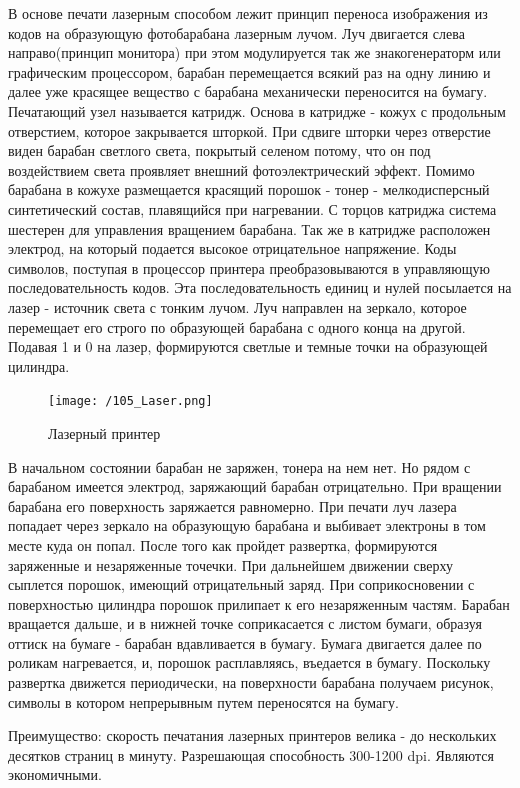 \documentclass[unicode, 12pt, a4paper, oneside]{article}
\begin{document}
В основе печати лазерным способом лежит принцип переноса изображения из кодов на образующую фотобарабана лазерным лучом. Луч двигается слева направо(принцип монитора) при этом модулируется так же знакогенераторм или графическим процессором, барабан перемещается всякий раз на одну линию и далее уже красящее вещество с барабана механически переносится на бумагу. Печатающий узел называется катридж. Основа в катридже - кожух с продольным отверстием, которое закрывается шторкой. При сдвиге шторки через отверстие виден барабан светлого света, покрытый селеном потому, что он под воздействием света проявляет внешний фотоэлектрический эффект. Помимо барабана в кожухе размещается красящий порошок - тонер - мелкодисперсный синтетический состав, плавящийся при нагревании. С торцов катриджа система шестерен для управления вращением барабана. Так же в катридже расположен электрод, на который подается высокое отрицательное напряжение. Коды символов, поступая в процессор принтера преобразовываются в управляющую последовательность кодов. Эта последовательность единиц и нулей посылается на лазер - источник света с тонким лучом. Луч направлен на зеркало, которое перемещает его строго по образующей барабана с одного конца на другой. Подавая 1 и 0 на лазер, формируются светлые и темные точки на образующей цилиндра.
\begin{figure}[H]
\centering
\texttt{[image: /105\_Laser.png]}
\caption{Лазерный принтер}
\end{figure}
В начальном состоянии барабан не заряжен, тонера на нем нет. Но рядом с барабаном имеется электрод, заряжающий барабан отрицательно. При вращении барабана его поверхность заряжается равномерно. При печати луч лазера попадает через зеркало на образующую барабана и выбивает электроны в том месте куда он попал. После того как пройдет развертка, формируются заряженные и незаряженные точечки. При дальнейшем движении сверху сыплется порошок, имеющий отрицательный заряд. При соприкосновении с поверхностью цилиндра порошок прилипает к его незаряженным частям. Барабан вращается дальше, и в нижней точке соприкасается с листом бумаги, образуя оттиск на бумаге - барабан вдавливается в бумагу. Бумага двигается далее по роликам нагревается, и, порошок расплавляясь, въедается в бумагу. Поскольку развертка движется периодически, на поверхности барабана получаем рисунок, символы в котором непрерывным путем переносятся на бумагу.

Преимущество: скорость печатания лазерных принтеров велика - до нескольких десятков страниц в минуту. Разрешающая способность 300-1200 dpi. Являются экономичными.
\end{document}
